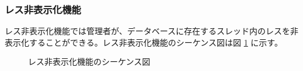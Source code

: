 \documentclass[a4j]{jarticle}
\begin{document}
 \subsubsection{レス非表示化機能}
 レス非表示化機能では管理者が、データベースに存在するスレッド内のレスを非表示化することができる。レス非表示化機能のシーケンス図は図 \ref{fig:admin_bbs_res-hide.png} に示す。
              \begin{figure}[H]
\centering
{}
\caption{レス非表示化機能のシーケンス図}
\label{fig:admin_bbs_res-hide.png}
\end{figure}
\end{document}
